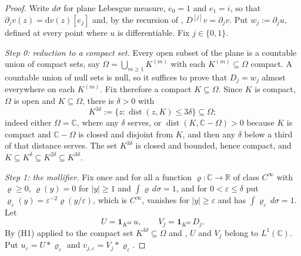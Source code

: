 \begin{proof}
Write $d\sigma$ for plane Lebesgue measure, $e_0=1$ and $e_1=i$, so that
$\partial_j v(z)=\mathrm{d}v(z)[e_j]$ and, by the recursion of
, $D^{[j]}v=\partial_jv$.  Put $w_j:=\partial_ju$, defined
at every point where $u$ is differentiable.  Fix $j\in\{0,1\}$.

\emph{Step 0: reduction to a compact set.}  Every open subset of the plane is a
countable union of compact sets, say $\Omega=\bigcup_{m\ge1}K^{(m)}$ with each
$K^{(m)}\subseteq\Omega$ compact.  A countable union of null sets is null, so
it suffices to prove that $D_j=w_j$ almost everywhere on each $K^{(m)}$.  Fix
therefore a compact $K\subseteq\Omega$.  Since $K$ is compact, $\Omega$ is open
and $K\subseteq\Omega$, there is $\delta>0$ with
\[
  K^{3\delta}:=\{z:\operatorname{dist}(z,K)\le3\delta\}\subseteq\Omega ;
\]
indeed either $\Omega=\mathbb{C}$, where any $\delta$ serves, or
$\operatorname{dist}(K,\mathbb{C}-\Omega)>0$ because $K$ is compact and
$\mathbb{C}-\Omega$ is closed and disjoint from $K$, and then any $\delta$
below a third of that distance serves.  The set $K^{3\delta}$ is closed and
bounded, hence compact, and $K\subseteq K^{\delta}\subseteq K^{2\delta}
\subseteq K^{3\delta}$.

\emph{Step 1: the mollifier.}  Fix once and for all a function
$\varrho\colon\mathbb{C}\to\mathbb{R}$ of class $C^\infty$ with
$\varrho\ge0$, $\varrho(y)=0$ for $|y|\ge1$ and $\int\varrho\,d\sigma=1$, and
for $0<\varepsilon\le\delta$ put
$\varrho_\varepsilon(y)=\varepsilon^{-2}\varrho(y/\varepsilon)$, which is
$C^\infty$, vanishes for $|y|\ge\varepsilon$ and has
$\int\varrho_\varepsilon\,d\sigma=1$.  Let
\[
  U=\mathbf{1}_{K^{3\delta}}\,u,\qquad V_j=\mathbf{1}_{K^{3\delta}}\,D_j .
\]
By (H1) applied to the compact set $K^{3\delta}\subseteq\Omega$ and
, $U$ and $V_j$ belong to $L^{1}(\mathbb{C})$.  Put
$u_\varepsilon=U*\varrho_\varepsilon$ and
$v_{j,\varepsilon}=V_j*\varrho_\varepsilon$.


\end{proof}
